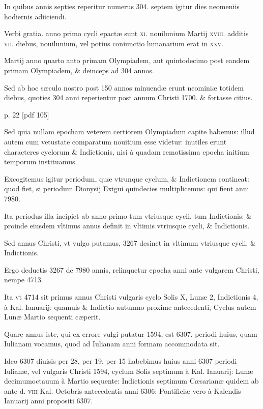 In quibus annis septies reperitur
numerus 304. septem igitur dies neomeniis hodiernis adiiciendi.

Verbi gratia. anno primo cycli epactæ sunt \textsc{xi}. nouilunium
Martij \textsc{xviii}. additis
 \textsc{vii}. diebus, nouilunium, vel potius coniunctio
lumanarium erat in \textsc{xxv}.

Martij anno quarto anto primam Olympiadem,
aut quintodecimo post eandem primam Olympiadem, \& deinceps
ad 304 annos.

Sed ab hoc sæculo nostro post 150 annos minuendæ
erunt neominiæ totidem diebus, quoties 304 anni reperientur
post annum Christi 1700. \& fortasse citius.



p. 22 [pdf 105]


Sed quia nullam epocham
veterem certiorem Olympiadum capite habemus: illud autem 
cum vetustate comparatum nouitium esse videtur: inutiles erunt characteres
cyclorum \& Indictionis, nisi à quadam remotissima epocha
initium temporum instituamus.

Excogitemus igitur periodum,
quæ vtrunque cyclum, \& Indictionem contineat: quod fiet, si periodum
Dionysij Exigui quindecies multiplicemus: qui fient anni
7980.

Ita periodus illa incipiet ab anno primo tum vtriusque cycli,
tum Indictionis: \& proinde eiusdem vltimus annus definit in vltimis
vtriusque cycli, \& Indictionis.

Sed annus Christi, vt vulgo putamus,
3267 desinet in vltimum vtriusque cycli, \& Indictionis.

Ergo deductis
3267 de 7980 annis, relinquetur epocha anni ante vulgarem 
Christi, nempe 4713.

Ita vt 4714 sit primus annus Christi vulgaris cyclo
Solis \textsc{X}, Lunæ 2, Indictionis 4, à Kal. Ianuarij: quamuis \& Indictio
autumno proxime antecedenti, Cyclus autem Lunæ Martio sequenti
cæperit.

Quare annus iste, qui ex errore vulgi putatur 1594, est 6307.
periodi huius, quam Iulianam vocamus, quod ad Iulianam anni formam
accommodata sit.

Ideo 6307 diuisis per 28, per 19, per 15 habebimus
huius anni 6307 periodi Iulianæ, vel vulgaris Christi 1594, cyclum
Solis septimum à Kal. Ianuarij: Lunæ decimumoctauum à
Martio sequente: Indictionis septimum Cæsarianæ quidem ab ante d.
\textsc{viii} Kal. Octobris antecedentis anni 6306: Pontificiæ vero à
 Kalendis Ianuarij anni propositi 6307.

